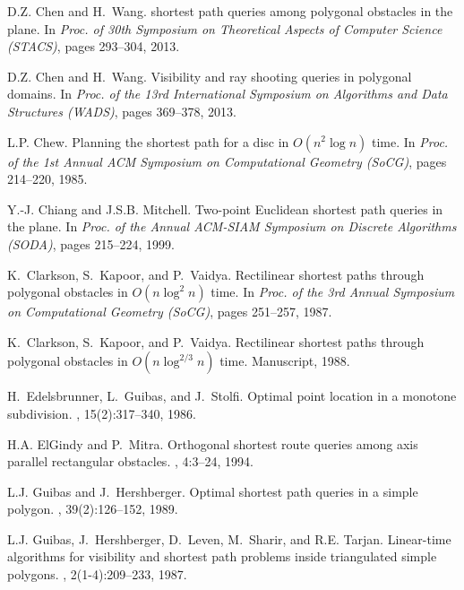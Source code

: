 \documentclass[english,runningheads,11pt]{llncs}
\begin{document}
\begin{thebibliography}{10}
D.Z. Chen and H.~Wang.
 shortest path queries among polygonal obstacles in the plane.
\newblock In {\em Proc. of 30th Symposium on Theoretical Aspects of Computer
  Science (STACS)}, pages 293--304, 2013.

D.Z. Chen and H.~Wang.
\newblock Visibility and ray shooting queries in polygonal domains.
\newblock In {\em Proc. of the 13rd International Symposium on Algorithms and
  Data Structures (WADS)}, pages 369--378, 2013.

L.P. Chew.
\newblock Planning the shortest path for a disc in {$O(n^2\log n)$} time.
\newblock In {\em Proc. of the 1st Annual ACM Symposium on Computational
  Geometry (SoCG)}, pages 214--220, 1985.

Y.-J. Chiang and J.S.B. Mitchell.
\newblock Two-point {Euclidean} shortest path queries in the plane.
\newblock In {\em Proc. of the Annual ACM-SIAM Symposium on Discrete Algorithms
  (SODA)}, pages 215--224, 1999.

K.~Clarkson, S.~Kapoor, and P.~Vaidya.
\newblock Rectilinear shortest paths through polygonal obstacles in {$O(n
  \log^2 n)$} time.
\newblock In {\em Proc. of the 3rd Annual Symposium on Computational Geometry
  (SoCG)}, pages 251--257, 1987.

K.~Clarkson, S.~Kapoor, and P.~Vaidya.
\newblock Rectilinear shortest paths through polygonal obstacles in {$O(n
  \log^{2/3} n)$} time.
\newblock Manuscript, 1988.

H.~Edelsbrunner, L.~Guibas, and J.~Stolfi.
\newblock Optimal point location in a monotone subdivision.
, 15(2):317--340, 1986.

H.A. ElGindy and P.~Mitra.
\newblock Orthogonal shortest route queries among axis parallel rectangular
  obstacles.
, 4:3--24, 1994.

L.J. Guibas and J.~Hershberger.
\newblock Optimal shortest path queries in a simple polygon.
, 39(2):126--152, 1989.

L.J. Guibas, J.~Hershberger, D.~Leven, M.~Sharir, and R.E. Tarjan.
\newblock Linear-time algorithms for visibility and shortest path problems
  inside triangulated simple polygons.
, 2(1-4):209--233, 1987.


\end{thebibliography}
\end{document}
